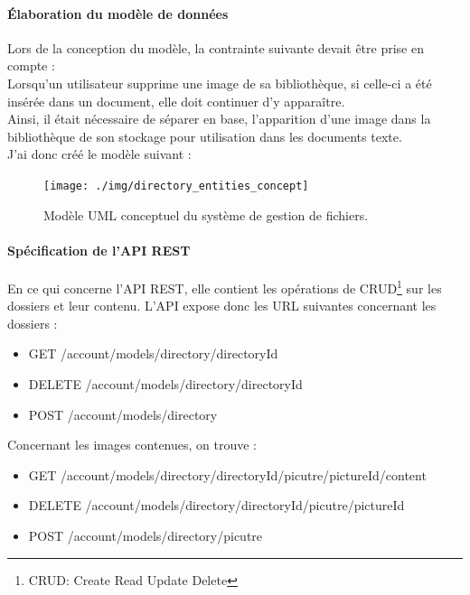 \paragraph*{Élaboration du modèle de données\\}
Lors de la conception du modèle, la contrainte suivante devait être prise en compte : \\
Lorsqu'un utilisateur supprime une image de sa bibliothèque, si celle-ci a été insérée dans un document, elle doit continuer d'y apparaître. \\
Ainsi, il était nécessaire de séparer en base, l'apparition d'une image dans la bibliothèque de son stockage pour utilisation dans les documents texte. \\
J'ai donc créé le modèle suivant : 

\begin{figure}[H]
  \centering
  \texttt{[image: ./img/directory\_entities\_concept]}
  \caption{\label{fig:mb_va_ast} Modèle UML conceptuel du système de gestion de fichiers.}
\end{figure}

\paragraph*{Spécification de l'API REST\\}
En ce qui concerne l'API REST, elle contient les opérations de CRUD\footnote{CRUD: Create Read Update Delete} sur les dossiers et leur contenu.
L'API expose donc les URL suivantes concernant les dossiers : 
\begin{itemize}
\item GET /account/models/directory/{directoryId}
\item DELETE /account/models/directory/{directoryId}
\item POST /account/models/directory
\end{itemize}

Concernant les images contenues, on trouve :
\begin{itemize}
\item GET /account/models/directory/{directoryId}/picutre/{pictureId}/content
\item DELETE /account/models/directory/{directoryId}/picutre/{pictureId}
\item POST /account/models/directory/picutre
\end{itemize}

